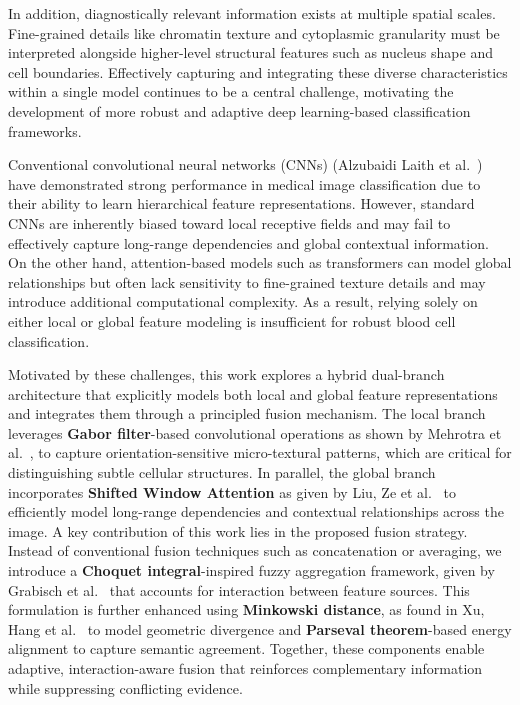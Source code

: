 \documentclass[12pt]{article}
\begin{document}
In addition, diagnostically relevant information exists at multiple spatial scales. Fine-grained details like chromatin texture and cytoplasmic granularity must be interpreted alongside higher-level structural features such as nucleus shape and cell boundaries. Effectively capturing and integrating these diverse characteristics within a single model continues to be a central challenge, motivating the development of more robust and adaptive deep learning-based classification frameworks.


Conventional convolutional neural networks (CNNs) (Alzubaidi Laith et al.~\cite{b37}) have demonstrated strong performance in medical image classification due to their ability to learn hierarchical feature representations. However, standard CNNs are inherently biased toward local receptive fields and may fail to effectively capture long-range dependencies and global contextual information. On the other hand, attention-based models such as transformers can model global relationships but often lack sensitivity to fine-grained texture details and may introduce additional computational complexity. As a result, relying solely on either local or global feature modeling is insufficient for robust blood cell classification.

Motivated by these challenges, this work explores a hybrid dual-branch architecture that explicitly models both local and global feature representations and integrates them through a principled fusion mechanism. The local branch leverages \textbf{Gabor filter}-based convolutional operations as shown by Mehrotra et al.~\cite{b33}, to capture orientation-sensitive micro-textural patterns, which are critical for distinguishing subtle cellular structures. In parallel, the global branch incorporates \textbf{Shifted Window Attention} as given by Liu, Ze et al.~\cite{b34} to efficiently model long-range dependencies and contextual relationships across the image. A key contribution of this work lies in the proposed fusion strategy. Instead of conventional fusion techniques such as concatenation or averaging, we introduce a \textbf{Choquet integral}-inspired fuzzy aggregation framework, given by Grabisch et al.~\cite{b35} that accounts for interaction between feature sources. This formulation is further enhanced using \textbf{Minkowski distance}, as found in Xu, Hang et al.~\cite{b36} to model geometric divergence and \textbf{Parseval theorem}-based energy alignment to capture semantic agreement. Together, these components enable adaptive, interaction-aware fusion that reinforces complementary information while suppressing conflicting evidence.
\end{document}
